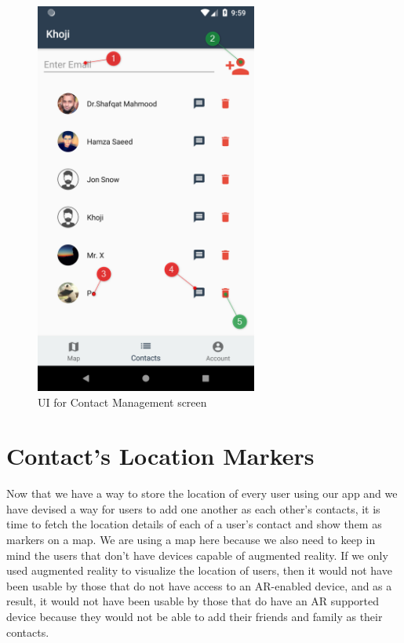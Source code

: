 \begin{figure}[H]
	\centering
		\includegraphics[width=0.65\textwidth]{images/khoji_contacts_1.png}
	\caption{UI for Contact Management screen}
	\label{fig:khoji_contacts}
\end{figure}



\section{Contact's Location Markers}
Now that we have a way to store the location of every user using our app and we have devised a way for users to add one another as each other's contacts, it is time to fetch the location details of each of a user's contact and show them as markers on a map. We are using a map here because we also need to keep in mind the users that don't have devices capable of augmented reality. If we only used augmented reality to visualize the location of users, then it would not have been usable by those that do not have access to an AR-enabled device, and as a result, it would not have been usable by those that do have an AR supported device because they would not be able to add their friends and family as their contacts.

